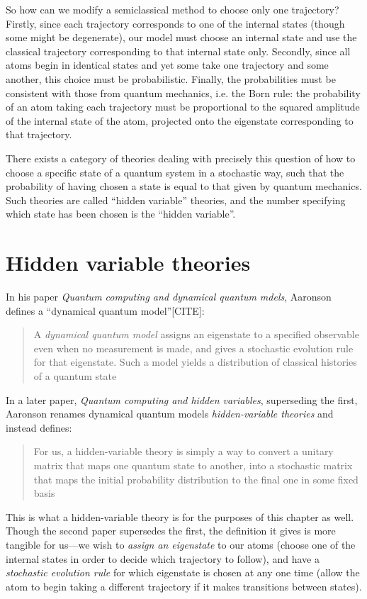 So how can we modify a semiclassical method to choose only one trajectory? Firstly, since each trajectory corresponds to one of the internal states (though some might be degenerate), our model must choose an internal state and use the classical trajectory corresponding to that internal state only. Secondly, since all atoms begin in identical states and yet some take one trajectory and some another, this choice must be probabilistic. Finally, the probabilities must be consistent with those from quantum mechanics, i.e. the Born rule: the probability of an atom taking each trajectory must be proportional to the squared amplitude of the internal state of the atom, projected onto the eigenstate corresponding to that trajectory.

There exists a category of theories dealing with precisely this question of how to choose a specific state of a quantum system in a stochastic way, such that the probability of having chosen a state is equal to that given by quantum mechanics. Such theories are called ``hidden variable'' theories, and the number specifying which state has been chosen is the ``hidden variable''.

\section{Hidden variable theories}

In his paper \emph{Quantum computing and dynamical quantum mdels}, Aaronson defines a ``dynamical quantum model''[CITE]:

\begin{quote}
A \emph{dynamical quantum model} assigns an eigenstate to a specified observable even when no measurement is made, and gives a stochastic evolution rule for that eigenstate. Such a model yields a distribution of classical histories of a quantum state
\end{quote}
In a later paper, \emph{Quantum computing and hidden variables}, superseding the first, Aaronson renames dynamical quantum models \emph{hidden-variable theories} and instead defines:
\begin{quote}
For us, a hidden-variable theory is simply a way to convert a unitary matrix that maps one quantum state to another, into a stochastic matrix that maps the initial probability distribution to the final one in some fixed basis
\end{quote}
This is what a hidden-variable theory is for the purposes of this chapter as well. Though the second paper supersedes the first, the definition it gives is more tangible for us---we wish to \emph{assign an eigenstate} to our atoms (choose one of the internal states in order to decide which trajectory to follow), and have a \emph{stochastic evolution rule} for which eigenstate is chosen at any one time (allow the atom to begin taking a different trajectory if it makes transitions between states).

